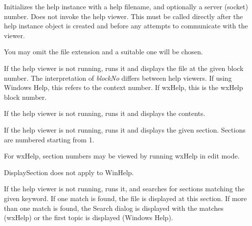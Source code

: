 
Initializes the help instance with a help filename, and optionally a server (socket)
number. Does not invoke the help viewer.
This must be called directly after the help instance object is created and before
any attempts to communicate with the viewer.

You may omit the file extension and a suitable one will be chosen.

\label{wxhelpcontrollerbasedisplayblock}


If the help viewer is not running, runs it and displays the file at the given block number.
The interpretation of {\it blockNo} differs between help viewers. If using Windows Help, this
refers to the context number. If wxHelp, this is the wxHelp block number.

\label{wxhelpcontrollerbasedisplaycontents}


If the help viewer is not running, runs it and displays the
contents.

\label{wxhelpcontrollerbasedisplaysection}


If the help viewer is not running, runs it and displays the given section.
Sections are numbered starting from 1.

For wxHelp, section numbers may be viewed by running wxHelp in edit mode.

DisplaySection does not apply to WinHelp.

\label{wxhelpcontrollerbasekeywordsearch}


If the help viewer is not running, runs it, and searches for sections matching the given keyword. If one
match is found, the file is displayed at this section. If more than one
match is found, the Search dialog is displayed with the matches (wxHelp)
or the first topic is displayed (Windows Help).

\label{wxhelpcontrollerbaseloadfile}

